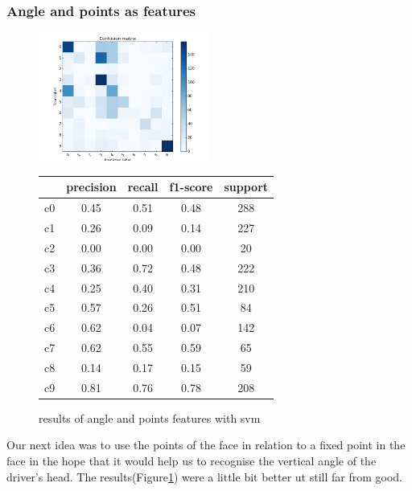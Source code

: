 \documentclass[10pt,twocolumn,letterpaper]{article}
\begin{document}
\subsubsection{Angle and points as features}
\begin{figure}[h]
	\centering
	\includegraphics[width=0.5\textwidth]{all_vs_all_headpose}\hspace{0.01\textwidth}
	\begin{tabular}{c||c|c|c|c}
	  & precision&recall&f1-score&support\\	\hline
	 c0&0.45&0.51&0.48&288\\
	 c1&0.26&0.09&0.14&227\\
	 c2&0.00&0.00&0.00&20\\
	 c3&0.36&0.72&0.48&222\\
	 c4&0.25&0.40&0.31&210\\
	 c5&0.57&0.26&0.51&84\\
	 c6&0.62&0.04&0.07&142\\
	 c7&0.62&0.55&0.59&65\\
	 c8&0.14&0.17&0.15&59\\
	 c9&0.81&0.76&0.78&208
	\end{tabular}
	\caption{results of angle and points features with svm}
	\label{headposeandpoints_feature}
	\end{figure}
Our next idea was to use the points of the face in relation to a fixed point in the face in the hope that it would help us to recognise the vertical angle of the driver's head. The results(Figure\ref{headposeandpoints_feature}) were a little bit better ut still far from good.
\end{document}

